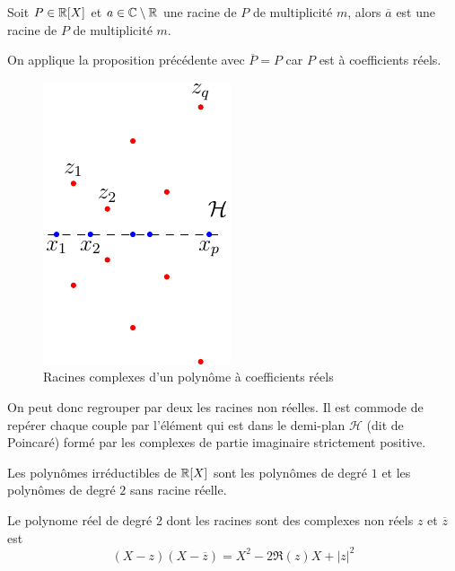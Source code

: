 \begin{prop}
 Soit $P\in \mathbb{R}[X]$ et $a\in \mathbb{C}\setminus \mathbb{R}$ une racine de $P$ de multiplicité $m$, alors $\overline{a}$ est une racine de $P$ de multiplicité $m$.
\end{prop}
\begin{demo}
 On applique la proposition précédente avec $\overline{P}=P$ car $P$ est à coefficients réels.
\end{demo}

\begin{figure}[ht]{}
 \centering
 \includegraphics{C2159_1.pdf}
 \caption{Racines complexes d'un polynôme à coefficients réels}
 \label{fig:C2159_1}
\end{figure}

\begin{rem}
 On peut donc regrouper par deux les racines non réelles. Il est commode de repérer chaque couple par l'élément qui est dans le demi-plan $\mathcal H$ (dit de Poincaré)  formé par les complexes de partie imaginaire strictement positive.
\end{rem}

\begin{prop}
Les polynômes irréductibles de $\mathbb{R}[X]$ sont les polynômes de degré $1$ et les polynômes de degré $2$ sans racine réelle.
\end{prop}
\begin{rem}
 Le polynome réel de degré 2 dont les racines sont des complexes non réels $z$ et $\overline{z}$ est
\begin{displaymath}
 (X-z)(X-\overline{z})=X^2 - 2\Re(z)X+|z|^2
\end{displaymath}
\end{rem}


